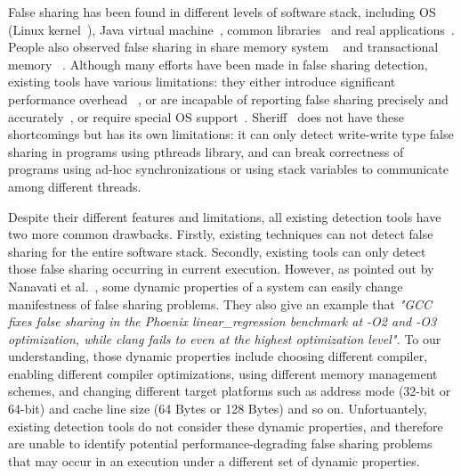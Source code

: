 False sharing has been found in different levels of software stack, including
OS (Linux kernel~\cite{OSfalsesharing}), Java virtual machine~\cite{JVMfalsesharing}, 
common libraries~\cite{libfalsesharing} and real applications~\cite{appfalsesharing, mysql}. 
People also observed false sharing in share memory system
~\cite{dsmfalsesharing} and transactional memory ~\cite{tmfalsesharing}.
Although many efforts have been made in false sharing detection, existing
tools have various limitations:
they either introduce significant performance overhead~
\cite{falseshare:simulator, falseshare:binaryinstrumentation1,falseshare:binaryinstrumentation2}, or 
are incapable of reporting false sharing 
precisely and accurately~\cite{qinzhaodetection, detect:ptu, detect:intel, falseshare:binaryinstrumentation1, DProf, falseshare:binaryinstrumentation2}, 
or require special OS support~\cite{OSdetection}.
Sheriff~\cite{sheriff} does not have these shortcomings but has its own limitations: 
it can only detect write-write type false sharing in programs using pthreads library,
and can break correctness of programs using ad-hoc synchronizations or using stack variables to 
communicate among different threads. 

Despite their different features and limitations, all existing detection tools 
have two more common drawbacks.
Firstly, existing techniques can not detect false sharing for 
the entire software stack.
Secondly, existing tools can only detect those false sharing occurring in current execution.
However, as pointed out by Nanavati et al.~\cite{OSdetection}, 
some dynamic properties of a system can easily change manifestness of false sharing problems.
They also give an example that 
{\it "GCC fixes false sharing in the Phoenix linear\_regression benchmark 
at -O2 and -O3 optimization, while clang fails to even at the highest
optimization level".}
To our understanding, those dynamic properties include 
choosing different compiler, 
enabling different compiler optimizations, 
using different memory management schemes,
and changing different target platforms such as address mode (32-bit or 64-bit) and cache line
size (64 Bytes or 128 Bytes) and so on. 
Unfortuantely, existing detection tools do not consider these dynamic properties, and
therefore are unable to identify potential performance-degrading false
sharing problems that may occur in an execution under a different set of 
dynamic properties.


